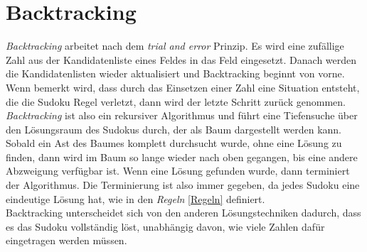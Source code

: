 \newpage
\section{Backtracking}
\label{Backtracking}
\textit{Backtracking} arbeitet nach dem \textit{trial and error} Prinzip. Es wird eine zufällige Zahl aus der Kandidatenliste eines Feldes in das Feld eingesetzt. Danach werden die Kandidatenlisten wieder aktualisiert und Backtracking beginnt von vorne. Wenn bemerkt wird, dass durch das Einsetzen einer Zahl eine Situation entsteht, die die Sudoku Regel verletzt, dann wird der letzte Schritt zurück genommen. \textit{Backtracking} ist also ein rekursiver Algorithmus und führt eine Tiefensuche über den Lösungsraum des Sudokus durch, der als Baum dargestellt werden kann. Sobald ein Ast des Baumes komplett durchsucht wurde, ohne eine Lösung zu finden, dann wird im Baum so lange wieder nach oben gegangen, bis eine andere Abzweigung verfügbar ist. Wenn eine Lösung gefunden wurde, dann terminiert der Algorithmus. Die Terminierung ist also immer gegeben, da jedes Sudoku eine eindeutige Lösung hat, wie in den \textit{Regeln} \ref{Regeln} definiert.\\
Backtracking unterscheidet sich von den anderen Lösungstechniken dadurch, dass es das Sudoku vollständig löst, unabhängig davon, wie viele Zahlen dafür eingetragen werden müssen.
